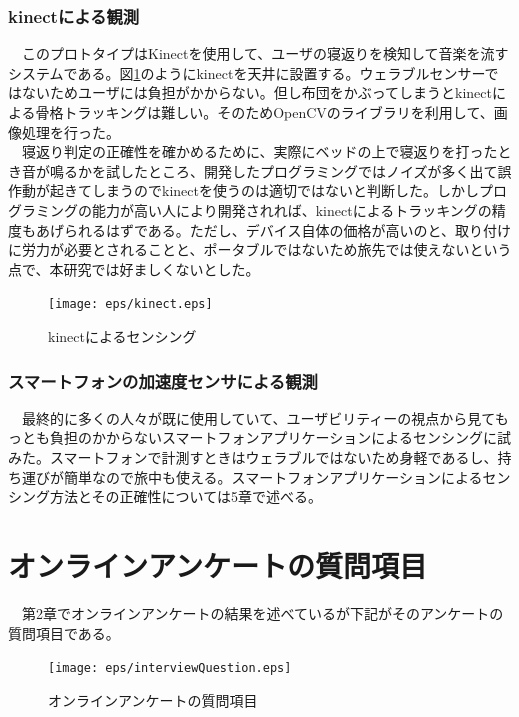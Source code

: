 \subsubsection{kinectによる観測}
　このプロトタイプはKinectを使用して、ユーザの寝返りを検知して音楽を流すシステムである。図\ref{kinect}のようにkinectを天井に設置する。ウェラブルセンサーではないためユーザには負担がかからない。但し布団をかぶってしまうとkinectによる骨格トラッキングは難しい。そのためOpenCVのライブラリを利用して、画像処理を行った。\\
　寝返り判定の正確性を確かめるために、実際にベッドの上で寝返りを打ったとき音が鳴るかを試したところ、開発したプログラミングではノイズが多く出て誤作動が起きてしまうのでkinectを使うのは適切ではないと判断した。しかしプログラミングの能力が高い人により開発されれば、kinectによるトラッキングの精度もあげられるはずである。ただし、デバイス自体の価格が高いのと、取り付けに労力が必要とされることと、ポータブルではないため旅先では使えないという点で、本研究では好ましくないとした。

\begin{figure}[htbp]
\begin{center}
\texttt{[image: eps/kinect.eps]}
\caption{kinectによるセンシング}
\label{kinect}
\end{center}
\end{figure}

\subsubsection{スマートフォンの加速度センサによる観測}
　最終的に多くの人々が既に使用していて、ユーザビリティーの視点から見てもっとも負担のかからないスマートフォンアプリケーションによるセンシングに試みた。スマートフォンで計測すときはウェラブルではないため身軽であるし、持ち運びが簡単なので旅中も使える。スマートフォンアプリケーションによるセンシング方法とその正確性については5章で述べる。

\section{オンラインアンケートの質問項目}
　第2章でオンラインアンケートの結果を述べているが下記がそのアンケートの質問項目である。
\begin{figure}[htbp]
\begin{center}
\texttt{[image: eps/interviewQuestion.eps]}
\caption{オンラインアンケートの質問項目}
\label{interviewQuestion}
\end{center}
\end{figure}